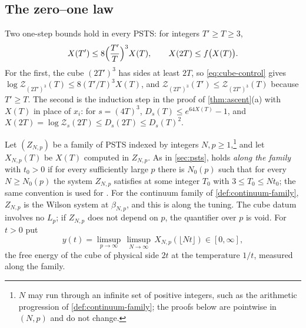 \documentclass[11pt,a4paper]{amsart}
\theoremstyle{definition}
\theoremstyle{remark}
\numberwithin{equation}{section}
\newcommand{\PSTS}{\textup{PSTS}}          %
\newcommand{\TT}{\mathbb{T}}               %
\newcommand{\Zc}{\mathcal{Z}}              %
\newcommand{\Zs}[2]{\Zc_{#1}(#2)}          %
\newcommand{\Dexc}[2]{D_{#1}(#2)}          %
\newcommand{\cube}[1]{(2#1)^3}             %
\newcommand{\Mcirc}{\text{\upshape(M$^{\circ}$)}}   %
\newcommand{\Bcirc}{\text{\upshape(B$^{\circ}$)}}   %
\newcommand{\tzero}{t_0}                   %
\newcommand{\Lp}{L_p}                      %
\newcommand{\betaNp}{\beta_{N,p}}          %
\begin{document}
\subsection{The zero--one law}

Two one-step bounds hold in every \PSTS{}: for integers $T'\ge T\ge3$,
\begin{equation}\label{eq:one-step}
X(T')\le8\Bigl(\frac{T'}{T}\Bigr)^3X(T),\qquad X(2T)\le f\bigl(X(T)\bigr).
\end{equation}
For the first, the cube $\cube{T'}$ has sides at least $2T$, so \eqref{eq:cube-control} gives $\log\Zs{\cube{T'}}{T}\le8(T'/T)^3X(T)$, and $\Zs{\cube{T'}}{T'}\le\Zs{\cube{T'}}{T}$ because $T'\ge T$. The second is the induction step in the proof of \cref{thm:ascent}(a) with $X(T)$ in place of $x_i$: for $s=(4T)^3$, $\Dexc{s}{T}\le e^{64X(T)}-1$, and $X(2T)=\log\Zs{s}{2T}\le\Dexc{s}{2T}\le\Dexc{s}{T}^2$.

Let $(Z_{N,p})$ be a family of \PSTS{} indexed by integers $N,p\ge1$,\footnote{$N$ may run through an infinite set of positive integers, such as the arithmetic progression of \cref{def:continuum-family}; the proofs below are pointwise in $(N,p)$ and do not change.} and let $X_{N,p}(T)$ be $X(T)$ computed in $Z_{N,p}$. As in \cref{sec:psts}, \Mcirc{} holds \emph{along the family} with $\tzero>0$ if for every sufficiently large $p$ there is $N_0(p)$ such that for every $N\ge N_0(p)$ the system $Z_{N,p}$ satisfies \Mcirc{} at some integer $T_0$ with $3\le T_0\le N\tzero$; the same convention is used for \Bcirc{}. For the continuum family of \cref{def:continuum-family}, $Z_{N,p}$ is the Wilson system at $\betaNp$, and this is \Mcirc{} along the tuning. The cube datum involves no $\Lp$; if $Z_{N,p}$ does not depend on $p$, the quantifier over $p$ is void. For $t>0$ put
\[
y(t)=\limsup_{p\to\infty}\,\limsup_{N\to\infty}\,X_{N,p}(\lfloor Nt\rfloor)\in[0,\infty],
\]
the free energy of the cube of physical side $2t$ at the temperature $1/t$, measured along the family.
\end{document}
